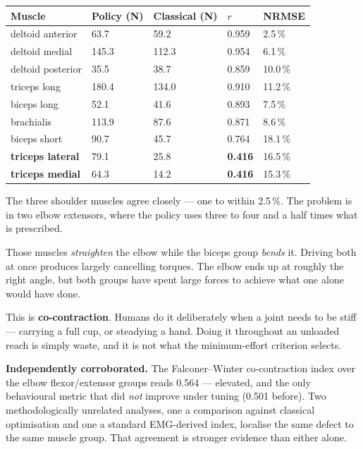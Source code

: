 \begin{center}
\begin{tabular}{@{} L{3.6cm} R{2.2cm} R{2.4cm} R{1.6cm} R{1.8cm} @{}}
\toprule
\textbf{Muscle} & \textbf{Policy (N)} & \textbf{Classical (N)} & \textbf{$r$} & \textbf{NRMSE} \\
\midrule
deltoid anterior  &  63.7 &  59.2 & 0.959 &  2.5\,\% \\
deltoid medial    & 145.3 & 112.3 & 0.954 &  6.1\,\% \\
deltoid posterior &  35.5 &  38.7 & 0.859 & 10.0\,\% \\
triceps long      & 180.4 & 134.0 & 0.910 & 11.2\,\% \\
biceps long       &  52.1 &  41.6 & 0.893 &  7.5\,\% \\
brachialis        & 113.9 &  87.6 & 0.871 &  8.6\,\% \\
biceps short      &  90.7 &  45.7 & 0.764 & 18.1\,\% \\
\textbf{triceps lateral} &  79.1 &  25.8 & \textbf{0.416} & 16.5\,\% \\
\textbf{triceps medial}  &  64.3 &  14.2 & \textbf{0.416} & 15.3\,\% \\
\bottomrule
\end{tabular}
\end{center}

\begin{plain}
The three shoulder muscles agree closely --- one to within 2.5\,\%. The problem is
in two elbow extensors, where the policy uses three to four and a half times what
is prescribed.

Those muscles \emph{straighten} the elbow while the biceps group \emph{bends} it.
Driving both at once produces largely cancelling torques. The elbow ends up at
roughly the right angle, but both groups have spent large forces to achieve what
one alone would have done.

This is \textbf{co-contraction}. Humans do it deliberately when a joint needs to
be stiff --- carrying a full cup, or steadying a hand. Doing it throughout an
unloaded reach is simply waste, and it is not what the minimum-effort criterion
selects.
\end{plain}

\textbf{Independently corroborated.} The Falconer--Winter co-contraction index
over the elbow flexor/extensor groups reads 0.564 --- elevated, and the only
behavioural metric that did \emph{not} improve under tuning (0.501 before). Two
methodologically unrelated analyses, one a comparison against classical
optimisation and one a standard EMG-derived index, localise the same defect to
the same muscle group. That agreement is stronger evidence than either alone.

